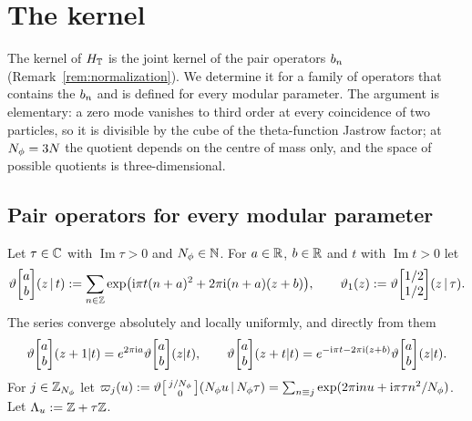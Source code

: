 \section{The kernel}\label{sec:kernel}

The kernel of $H_{\mathbb{T}}$ is the joint kernel of the pair operators $b_{n}$ (Remark~\ref{rem:normalization}). We determine
it for a family of operators that contains the $b_{n}$ and is defined for every modular parameter. The argument is
elementary: a zero mode vanishes to third order at every coincidence of two particles, so it is divisible by the cube
of the theta-function Jastrow factor; at $N_{\phi}=3N$ the quotient depends on the centre of mass only, and the space
of possible quotients is three-dimensional.

\subsection{Pair operators for every modular parameter}

Let $\tau\in\mathbb{C}$ with $\operatorname{Im}\tau>0$ and $N_{\phi}\in\mathbb{N}$. For $a\in\mathbb{R}$, $b\in\mathbb{R}$ and $t$ with $\operatorname{Im}t>0$ let
\[
\vartheta\!\begin{bmatrix}a\\b\end{bmatrix}\!(z\,|\,t):=\sum_{n\in\mathbb{Z}}\exp\bigl(\mathrm{i}\pi t(n+a)^2+2\pi\mathrm{i}(n+a)(z+b)\bigr),
\qquad \vartheta_1(z):=\vartheta\!\begin{bmatrix}1/2\\1/2\end{bmatrix}\!(z\,|\,\tau).
\]
The series converge absolutely and locally uniformly, and directly from them
\begin{equation}\label{eq:thetashift}
\vartheta\!\begin{bmatrix}a\\b\end{bmatrix}\!(z+1|t)=e^{2\pi\iu a}\vartheta\!\begin{bmatrix}a\\b\end{bmatrix}\!(z|t),\qquad
\vartheta\!\begin{bmatrix}a\\b\end{bmatrix}\!(z+t|t)=e^{-\iu\pi t-2\pi\iu(z+b)}\vartheta\!\begin{bmatrix}a\\b\end{bmatrix}\!(z|t).
\end{equation}
For $j\in\mathbb{Z}_{N_{\phi}}$ let $\varpi_j(u):=\vartheta\bigl[\begin{smallmatrix}j/N_{\phi}\\0\end{smallmatrix}\bigr](N_{\phi} u\,|\,N_{\phi}\tau)
=\sum_{n\equiv j}\exp(2\pi\mathrm{i} nu+\mathrm{i}\pi\tau n^2/N_{\phi})$. Let $\Lambda_u:=\mathbb{Z}+\tau\mathbb{Z}$.

